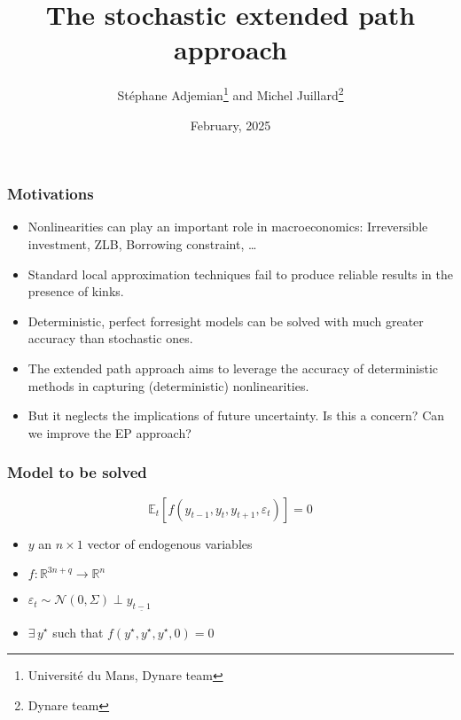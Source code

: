 \documentclass{beamer}
\begin{document}
\title{The stochastic extended path approach}
\author{St\'ephane Adjemian\footnote{Universit\'e du Mans, Dynare team} and Michel Juillard\footnote{Dynare team}}
\date{February, 2025}

\begin{frame}
  \titlepage{}
\end{frame}


\begin{frame}
  \frametitle{Motivations}

  \begin{itemize}

  \item Nonlinearities can play an important role in macroeconomics:
    Irreversible investment, ZLB, Borrowing constraint, \ldots\newline

  \item Standard local approximation techniques fail to produce
    reliable results in the presence of kinks.\newline

  \item Deterministic, perfect forresight models can be solved with much
    greater accuracy than stochastic ones.\newline

  \item The extended path approach aims to leverage the accuracy of
    deterministic methods in capturing (deterministic) nonlinearities.\newline

  \item But it neglects the implications of future uncertainty. Is
    this a concern? Can we improve the EP approach?
    
  \end{itemize}
\end{frame}


\begin{frame}
\frametitle{Model to be solved}

\[
\mathbb E_t\left[ f\left( y_{t-1},y_t,y_{t+1},\varepsilon_t \right) \right] = 0
\]

\bigskip

\begin{itemize}

\item $y$ an $n\times 1$ vector of endogenous variables\newline

\item $f: \mathbb R^{3n+q}\rightarrow \mathbb R^n$\newline

\item $\varepsilon_t \sim \mathcal N\left( 0,\Sigma \right) \perp y_{\underline{t-1}}$\newline

\item $ \exists\, y^{\star}$ such that $f\left( y^{\star},y^{\star},y^{\star},0 \right)=0$
  
\end{itemize}

\end{frame}
\end{document}
